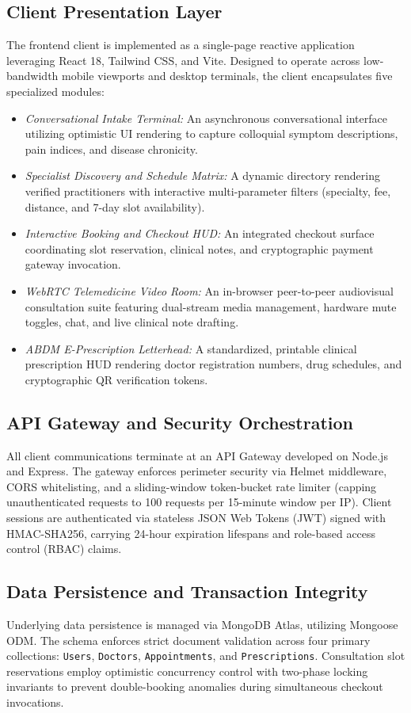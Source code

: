 \documentclass[conference]{IEEEtran}
\begin{document}
\subsection{Client Presentation Layer}
The frontend client is implemented as a single-page reactive application leveraging React 18, Tailwind CSS, and Vite. Designed to operate across low-bandwidth mobile viewports and desktop terminals, the client encapsulates five specialized modules:
\begin{itemize}
    \item \textit{Conversational Intake Terminal:} An asynchronous conversational interface utilizing optimistic UI rendering to capture colloquial symptom descriptions, pain indices, and disease chronicity.
    \item \textit{Specialist Discovery and Schedule Matrix:} A dynamic directory rendering verified practitioners with interactive multi-parameter filters (specialty, fee, distance, and 7-day slot availability).
    \item \textit{Interactive Booking and Checkout HUD:} An integrated checkout surface coordinating slot reservation, clinical notes, and cryptographic payment gateway invocation.
    \item \textit{WebRTC Telemedicine Video Room:} An in-browser peer-to-peer audiovisual consultation suite featuring dual-stream media management, hardware mute toggles, chat, and live clinical note drafting.
    \item \textit{ABDM E-Prescription Letterhead:} A standardized, printable clinical prescription HUD rendering doctor registration numbers, drug schedules, and cryptographic QR verification tokens.
\end{itemize}

\subsection{API Gateway and Security Orchestration}
All client communications terminate at an API Gateway developed on Node.js and Express. The gateway enforces perimeter security via Helmet middleware, CORS whitelisting, and a sliding-window token-bucket rate limiter (capping unauthenticated requests to 100 requests per 15-minute window per IP). Client sessions are authenticated via stateless JSON Web Tokens (JWT) signed with HMAC-SHA256, carrying 24-hour expiration lifespans and role-based access control (RBAC) claims.

\subsection{Data Persistence and Transaction Integrity}
Underlying data persistence is managed via MongoDB Atlas, utilizing Mongoose ODM. The schema enforces strict document validation across four primary collections: \texttt{Users}, \texttt{Doctors}, \texttt{Appointments}, and \texttt{Prescriptions}. Consultation slot reservations employ optimistic concurrency control with two-phase locking invariants to prevent double-booking anomalies during simultaneous checkout invocations.
\end{document}
